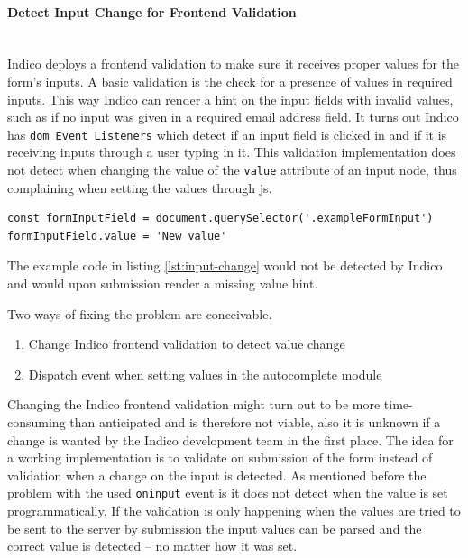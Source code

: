\vspace{0.5cm}
\paragraph{Detect Input Change for Frontend Validation}\mbox{}\\

Indico deploys a frontend validation to make sure it receives proper values for the form's inputs. A basic validation is the check for a presence of values in required inputs. This way Indico can render a hint on the input fields with invalid values, such as if no input was given in a required email address field. It turns out Indico has \texttt{\gls{dom} Event Listeners} which detect if an input field is clicked in and if it is receiving inputs through a user typing in it. This validation implementation does not detect when changing the value of the \texttt{value} attribute of an input node, thus complaining when setting the values through \gls{js}.

\begin{lstlisting}[language=Other,columns=fullflexible, caption={Changing the value of an input node.}, label={lst:input-change}]
const formInputField = document.querySelector('.exampleFormInput')
formInputField.value = 'New value'
\end{lstlisting}

The example code in listing \ref{lst:input-change} would not be detected by Indico and would upon submission render a missing value hint.

Two ways of fixing the problem are conceivable.

\begin{enumerate}
    \item Change Indico frontend validation to detect value change
    \item Dispatch event when setting values in the autocomplete module
\end{enumerate}

Changing the Indico frontend validation might turn out to be more time-consuming than anticipated and is therefore not viable, also it is unknown if a change is wanted by the Indico development team in the first place. The idea for a working implementation is to validate on submission of the form instead of validation when a change on the input is detected. As mentioned before the problem with the used \texttt{oninput} event is it does not detect when the value is set programmatically. If the validation is only happening when the values are tried to be sent to the server by submission the input values can be parsed and the correct value is detected -- no matter how it was set. 

